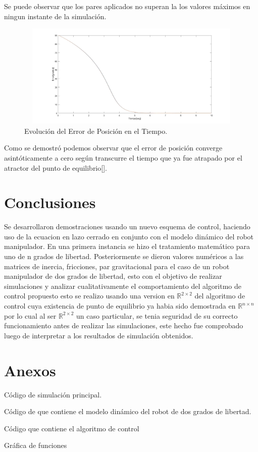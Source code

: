 \documentclass[12pt]{article}
\begin{document}
\begin{enumerate}
    Se puede observar que los pares aplicados no superan la los valores máximos en ningun instante de la simulación.
    
    \begin{figure}[h]
        \centering
        \includegraphics[width=14cm, height=5cm]{IMAGENES/error.jpg}
        \caption{Evolución del Error de Posición en el Tiempo.}
        \label{fig:error}
    \end{figure}

    Como se demostró podemos observar que el error de posición converge asintóticamente a cero según transcurre el tiempo que ya fue atrapado por el atractor del punto de equilibrio[\cite{reyes2011robotica}].
\end{enumerate}
\section{Conclusiones}
Se desarrollaron demostraciones usando un nuevo esquema de control, haciendo uso de la ecuacion en lazo cerrado en conjunto con el modelo dinámico del robot manipulador. En una primera instancia se hizo el tratamiento matemático para uno  de n grados de libertad. Posteriormente se dieron valores numéricos a las matrices de inercia, fricciones, par gravitacional para el caso de un robot manipulador de dos grados de libertad, esto con el objetivo de realizar simulaciones y analizar cualitativamente el comportamiento del algoritmo de control propuesto esto se realizo usando una version en $\mathbb{R}^{2\times2}$ del algoritmo de control cuya existencia de punto de equilibrio ya habia sido demostrada en $\mathbb{R}^{n\times n}$ por lo cual al ser $\mathbb{R}^{2\times2}$ un caso particular, se tenia seguridad de su correcto funcionamiento antes de realizar las simulaciones, este hecho fue comprobado luego de interpretar a los resultados de simulación obtenidos.



\newpage
\section{Anexos}
Código de simulación principal.

Código de que contiene el modelo dinámico del robot de dos grados de libertad.

\newpage
Código que contiene el algoritmo de control

Gráfica de funciones

\end{document}
